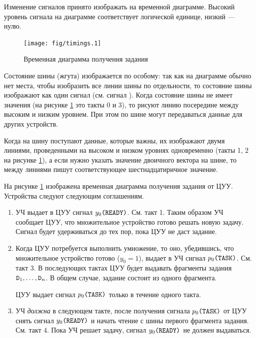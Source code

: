 Изменение сигналов принято изображать на временной диаграмме. Высокий уровень сигнала на диаграмме соответствует логической единице, низкий --- нулю.

\begin{figure}[!ht]
    \centering
    \texttt{[image: fig/timings.1]}
    \caption{Временная диаграмма получения задания}
    \label{fig::ch::practice::timingsTr}
\end{figure}

Состояние шины (жгута) изображается по особому: так как на диаграмме обычно нет места, чтобы изобразить все линии шины по отдельности, то состояние шины изображают как один сигнал (см. сигнал ). Когда состояние шины не имеет значения (на рисунке \ref{fig::ch::practice::timingsTr} это такты 0 и 3), то рисуют линию посередине между высоким и низким уровнем. При этом по шине могут передаваться данные для других устройств.

Когда на шину поступают данные, которые важны, их изображают двумя линиями, проведенными на высоком и низком уровнях одновременно (такты 1, 2 на рисунке \ref{fig::ch::practice::timingsTr}), а если нужно указать значение двоичного вектора на шине, то между линиями пишут соответствующее шестнадцатиричное значение.

На рисунке \ref{fig::ch::practice::timingsTr} изображена временная диаграмма получения задания от ЦУУ. Устройства следуют следующим соглашениям.
\begin{enumerate}
    \item УЧ выдает в ЦУУ сигнал $y_0\texttt{(READY)}$. См. такт 1. Таким образом УЧ сообщает ЦУУ, что множительное устройство готово решать новую задачу. Сигнал будет удерживаться до тех пор, пока ЦУУ не даст задание. 
    
    \item Когда ЦУУ потребуется выполнить умножение, то оно, убедившись, что множительное устройство готово ($y_0=1$), выдает в УЧ сигнал $p_0\texttt{(TASK)}$. См. такт 3. В последующих тактах ЦУУ будет выдавать фрагменты задания $\texttt{D}_1,\ldots,\texttt{D}_n$. В общем случае, задание состоит из одного фрагмента.
    
    ЦУУ выдает сигнал $p_0\texttt{(TASK)}$ только в течение одного такта.
    
    \item УЧ \emph{должна} в следующем такте, после получения сигнала  $p_0\texttt{(TASK)}$ от ЦУУ снять сигнал $y_0\texttt{(READY)}$ и начать чтение с шины первого фрагмента задания. См. такт 4. Пока УЧ решает задачу, сигнал $y_0\texttt{(READY)}$ не должен выдаваться.
\end{enumerate}


